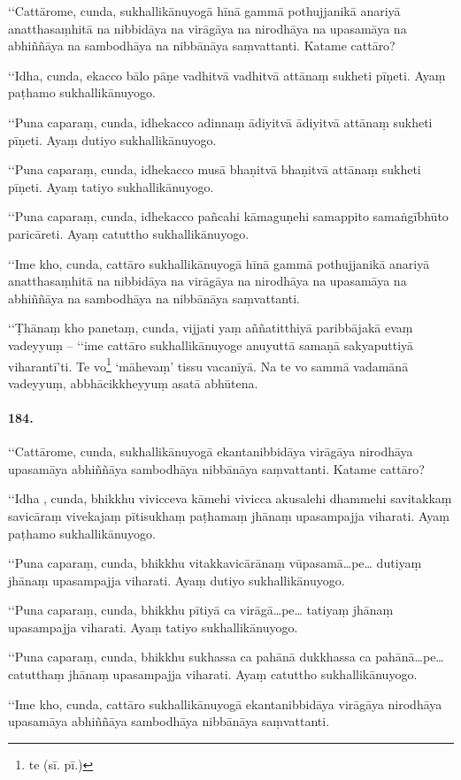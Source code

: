 ‘‘Cattārome, cunda, sukhallikānuyogā hīnā gammā pothujjanikā anariyā anatthasaṃhitā na nibbidāya na virāgāya na nirodhāya na upasamāya na abhiññāya na sambodhāya na nibbānāya saṃvattanti. Katame cattāro?

‘‘Idha, cunda, ekacco bālo pāṇe vadhitvā vadhitvā attānaṃ sukheti pīṇeti. Ayaṃ paṭhamo sukhallikānuyogo.

‘‘Puna caparaṃ, cunda, idhekacco adinnaṃ ādiyitvā ādiyitvā attānaṃ sukheti pīṇeti. Ayaṃ dutiyo sukhallikānuyogo.

‘‘Puna caparaṃ, cunda, idhekacco musā bhaṇitvā bhaṇitvā attānaṃ sukheti pīṇeti. Ayaṃ tatiyo sukhallikānuyogo.

‘‘Puna caparaṃ, cunda, idhekacco pañcahi kāmaguṇehi samappito samaṅgībhūto paricāreti. Ayaṃ catuttho sukhallikānuyogo.

‘‘Ime kho, cunda, cattāro sukhallikānuyogā hīnā gammā pothujjanikā anariyā anatthasaṃhitā na nibbidāya na virāgāya na nirodhāya na upasamāya na abhiññāya na sambodhāya na nibbānāya saṃvattanti.

‘‘Ṭhānaṃ kho panetaṃ, cunda, vijjati yaṃ aññatitthiyā paribbājakā evaṃ vadeyyuṃ – ‘‘ime cattāro sukhallikānuyoge anuyuttā samaṇā sakyaputtiyā viharantī’ti. Te vo\footnote{te (sī. pī.)} ‘māhevaṃ’ tissu vacanīyā. Na te vo sammā vadamānā vadeyyuṃ, abbhācikkheyyuṃ asatā abhūtena.

\paragraph{184.} ‘‘Cattārome, cunda, sukhallikānuyogā ekantanibbidāya virāgāya nirodhāya upasamāya abhiññāya sambodhāya nibbānāya saṃvattanti. Katame cattāro?

‘‘Idha , cunda, bhikkhu vivicceva kāmehi vivicca akusalehi dhammehi savitakkaṃ savicāraṃ vivekajaṃ pītisukhaṃ paṭhamaṃ jhānaṃ upasampajja viharati. Ayaṃ paṭhamo sukhallikānuyogo.

‘‘Puna caparaṃ, cunda, bhikkhu vitakkavicārānaṃ vūpasamā…pe… dutiyaṃ jhānaṃ upasampajja viharati. Ayaṃ dutiyo sukhallikānuyogo.

‘‘Puna caparaṃ, cunda, bhikkhu pītiyā ca virāgā…pe… tatiyaṃ jhānaṃ upasampajja viharati. Ayaṃ tatiyo sukhallikānuyogo.

‘‘Puna caparaṃ, cunda, bhikkhu sukhassa ca pahānā dukkhassa ca pahānā…pe… catutthaṃ jhānaṃ upasampajja viharati. Ayaṃ catuttho sukhallikānuyogo.

‘‘Ime kho, cunda, cattāro sukhallikānuyogā ekantanibbidāya virāgāya nirodhāya upasamāya abhiññāya sambodhāya nibbānāya saṃvattanti.

